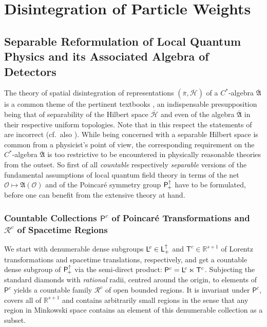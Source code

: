 \documentclass[a4paper,a4paper]{article}
\numberwithin{equation}{section}
\newcommand{\Oscr}{\mathscr{O}}
\newcommand{\Rsone}{\mathbb{R}^{s + 1}}
\newcommand{\Afrakbar}{\overline{\mathfrak{A}}}
\newcommand{\Hscrbar}{\overline{\mathscr{H}}}
\newcommand{\pibar}{\overline{\pi}}
\newcommand{\Lor}{\mathsf{L}_+^\uparrow}
\newcommand{\Poin}{\mathsf{P}_{\negthinspace +}^\uparrow}
\newcommand{\AO}{\mathfrak{A} ( \mathscr{O} )}
\newcommand{\Lcount}{\mathsf{L}^{\negthinspace c}}
\newcommand{\Pcount}{\mathsf{P}^c}
\newcommand{\Rcount}{\mathscr{R}^c}
\newcommand{\Tcount}{\mathsf{T}^c}
\theoremstyle{definition}
\theoremstyle{plain}
\theoremstyle{remark}
\theoremstyle{assumption}
\begin{document}
\section{Disintegration of Particle Weights}
  \label{sec:disintegration}

\subsection{Separable Reformulation of Local Quantum Physics and its
  Associated Algebra of Detectors}
  \label{subsec:separable-reformulation}
  
  The theory of spatial disintegration of representations $( \pibar ,
  \Hscrbar )$ of a $C^*$-algebra $\Afrakbar$ is a common theme of the
  pertinent textbooks \cite{dixmier:1981,dixmier:1982,takesaki:1979,%
    pedersen:1979,bratteli/robinson:1987}, an indispensable
  presupposition being that of separability of the Hilbert space
  $\Hscrbar$ and even of the algebra $\Afrakbar$ in their respective
  uniform topologies. Note that in this respect the statements of
  \cite[Section~4.4]{bratteli/robinson:1987} are incorrect (cf.~also
  \cite[Corrigenda]{bratteli/robinson:1997}). While being concerned
  with a separable Hilbert space is common from a physicist's point of
  view, the corresponding requirement on the $C^*$-algebra $\Afrakbar$
  is too restrictive to be encountered in physically reasonable
  theories from the outset. So first of all \emph{countable}
  respectively \emph{separable} versions of the fundamental
  assumptions of local quantum field theory in terms of the net $\Oscr
  \mapsto \AO$ and of the Poincar\'e symmetry group $\Poin$ have to be
  formulated, before one can benefit from the extensive theory at
  hand.
  
  \subsubsection{Countable Collections $\Pcount$ of Poincar\'e
    Transformations and $\Rcount$ of Spacetime Regions}
  
  We start with denumerable dense subgroups $\Lcount \in \Lor$ and
  $\Tcount \in \Rsone$ of Lorentz transformations and spacetime
  translations, respectively, and get a countable dense subgroup of
  $\Poin$ via the semi-direct product: $\Pcount = \Lcount \ltimes
  \Tcount$. Subjecting the standard diamonds with \emph{rational}
  radii, centred around the origin, to elements of $\Pcount$ yields a
  countable family $\Rcount$ of open bounded regions. It is invariant
  under $\Pcount$, covers all of $\Rsone$ and contains arbitrarily
  small regions in the sense that any region in Minkowski space
  contains an element of this denumerable collection as a subset.
  
\end{document}
